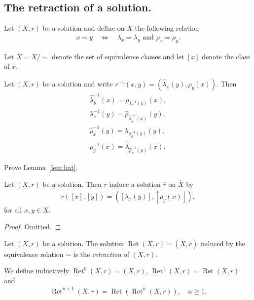 \subsection{The retraction of a solution.}

Let $(X,r)$ be a solution and define on $X$ the following relation
\begin{align*}
    x\sim y \quad \iff \quad \lambda_x=\lambda_y \text{ and } \rho_x=\rho_y.
\end{align*}

Let $\bar{X}=X/\sim$ denote the set of equivalence classes and let $[x]$ denote the class of $x$.

\begin{lemma}\label{lem:hat}
    Let $(X,r)$ be a solution and write $r^{-1}(x,y)= (\hat{\lambda}_x(y),\hat{\rho}_y(x))$.
    Then 
    \begin{align}
        \label{eq:hat1}\hat{\lambda}^{-1}_y(x)=\rho_{\lambda^{-1}_x(y)}(x),\\
        \label{eq:hat2}\lambda^{-1}_x(y)=\hat{\rho}_{\hat{\lambda}^{-1}_y(x)}(y),\\
        \label{eq:hat3}\hat{\rho}^{-1}_x(y)=\lambda_{\rho^{-1}_y(y)}(y),\\
        \label{eq:hat4}\rho^{-1}_y(x) = \hat{\lambda}_{\hat{\rho}^{-1}_x(y)}(x).
    \end{align}
\end{lemma}

\begin{exercise}
    \label{ex:hat}
    Prove Lemma~\ref{lem:hat}.
\end{exercise}

\begin{theorem}
    Let $(X,r)$ be a solution. Then $r$ induce a solution $\bar{r}$ on $\bar{X}$ by
    \begin{align*}
        \bar{r}([x],[y])= ([\lambda_x(y)], [\rho_y(x)]),
    \end{align*}
    for all $x,y\in X$.
\end{theorem}

\begin{proof}
    Omitted.
\end{proof}

\begin{definition}
    Let $(X,r)$ be a solution. The solution $\operatorname{Ret}(X,r) =(\bar{X},\bar{r})$ induced by the equivalence relation $\sim$ is the \emph{retraction} of $(X,r)$.

    We define inductively $\operatorname{Ret}^{0}(X,r)=(X,r)$, $\operatorname{Ret}^1(X,r)=\operatorname{Ret}(X,r)$ and 
    \begin{align*}
        \operatorname{Ret}^{n+1}(X,r) = \operatorname{Ret}(\operatorname{Ret}^n(X,r)), \quad n\geq 1.
    \end{align*}
\end{definition}


